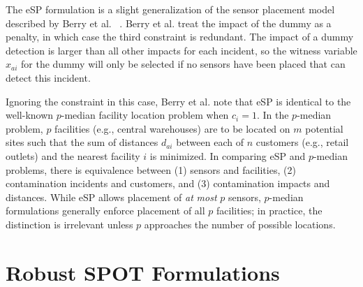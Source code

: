 The eSP formulation is a slight generalization of the sensor placement model described by Berry et al. ~\cite{BerHarPhiUbeWat06}. Berry et al. treat the impact of the dummy as a penalty, in which case the third constraint is redundant. The impact of a dummy detection is larger than all other impacts for each incident, so the witness variable $x_{ai}$ for the dummy will only be selected if no sensors have been placed that can detect this incident.

Ignoring the constraint in this case, Berry et al. note that eSP is identical to the well-\/known $p$-\/median facility location problem \citep{MirFra90} when $c_i=1$. In the $p$-\/median problem, $p$ facilities (e.g., central warehouses) are to be located on $m$ potential sites such that the sum of distances $d_{ai}$ between each of $n$ customers (e.g., retail outlets) and the nearest facility $i$ is minimized. In comparing eSP and $p$-\/median problems, there is equivalence between (1) sensors and facilities, (2) contamination incidents and customers, and (3) contamination impacts and distances. While eSP allows placement of {\itshape at\/} {\itshape most\/} $p$ sensors, $p$-\/median formulations generally enforce placement of all $p$ facilities; in practice, the distinction is irrelevant unless $p$ approaches the number of possible locations.

\section{Robust SPOT Formulations}\label{formulations_formulationsRobust}

